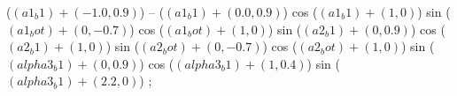 ($ (a1_b1) + (-1.0, 0.9) $) --
($ (a1_b1) + (0.0, 0.9) $) cos
($ (a1_b1) + (1, 0) $) sin
($ (a1_bot) + (0, -0.7) $) cos
($ (a1_bot) + (1, 0) $) sin
($ (a2_b1) + (0, 0.9) $) cos
($ (a2_b1) + (1, 0) $) sin
($ (a2_bot) + (0, -0.7) $) cos
($ (a2_bot) + (1, 0) $) sin
($ (alpha3_b1) + (0, 0.9) $) cos
($ (alpha3_b1) + (1, 0.4) $) sin
($ (alpha3_b1) + (2.2, 0) $)
;
